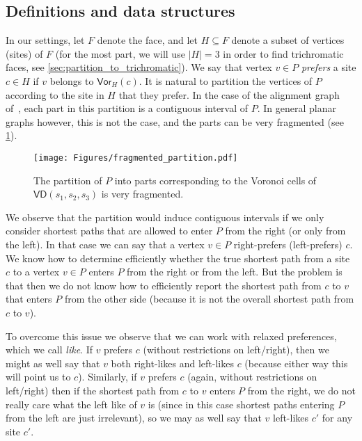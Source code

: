 \documentclass{article}
\newcommand{\Vor}{\textsf{Vor}}
\newcommand{\VD}{\textsf{VD}}
\begin{document}
\subsection{Definitions and data structures}


In our settings, let $F$ denote the face, and let $H\subseteq F$ denote a subset of vertices (sites) of $F$ (for the most part, we will use $|H|=3$ in order to find trichromatic faces, see \cref{sec:partition_to_trichromatic}).
We say that vertex $v\in P$ {\em prefers} a site $c \in H$ if $v$ belongs to $\Vor_H(c)$.
It is natural to partition the vertices of $P$ according to the site in $H$ that they prefer.
In the case of the alignment graph of~\cite{CharalampopoulosGM21}, each part in this partition is a contiguous interval of $P$.
In general planar graphs however, this is not the case, and the parts can be very fragmented (see \cref{fig:fragmented}).

\begin{figure}[htb]
\begin{minipage}[c]{0.25\textwidth}
    \texttt{[image: Figures/fragmented\_partition.pdf]}
  \end{minipage}\hfill
  \begin{minipage}[t]{0.7\textwidth}
    \caption{The partition of $P$ into parts corresponding to the Voronoi cells of $\VD(s_1,s_2,s_3)$ is very fragmented. \label{fig:fragmented}}
  \end{minipage}
\end{figure}


We observe that the partition would induce contiguous intervals if we only consider shortest paths that are allowed to enter $P$ from the right (or only from the left).
In that case we can say that a vertex $v \in P$ right-prefers (left-prefers) $c$.
We know how to determine efficiently whether  the true shortest path from a site $c$ to a vertex $v \in P$ enters $P$ from the right or from the left.
But the problem is that then we do not know how to efficiently report the shortest path from $c$ to $v$ that enters $P$ from the other side (because it is not the overall shortest path from $c$ to $v$).

To overcome this issue we observe that we can work with relaxed preferences, which we call \emph{like}.
If $v$ prefers $c$ (without restrictions on left/right), then we might as well say that $v$ both right-likes and left-likes $c$ (because either way this will point us to $c$).
Similarly, if $v$ prefers $c$ (again, without restrictions on left/right) then if the shortest path from $c$ to $v$ enters $P$ from the right, we do not really care what the left like of $v$ is (since in this case shortest paths entering $P$ from the left are just irrelevant), so we may as well say that $v$ left-likes $c'$ for any site $c'$.
\end{document}
